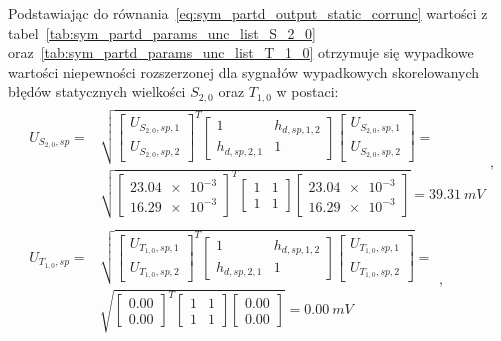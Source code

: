 Podstawiając do równania~\eqref{eq:sym_partd_output_static_corrunc} wartości z tabel~\ref{tab:sym_partd_params_unc_list_S_2_0} oraz~\ref{tab:sym_partd_params_unc_list_T_1_0} otrzymuje się wypadkowe wartości niepewności rozszerzonej dla sygnałów wypadkowych skorelowanych błędów statycznych wielkości $S_{2,0}$ oraz $T_{1,0}$ w postaci:
\begin{gather}
\begin{split}
U_{S_{2,0},sp} = & \sqrt{
\begin{bmatrix}
U_{S_{2,0},sp,1} \\ U_{S_{2,0},sp,2}
\end{bmatrix}^{T}
\begin{bmatrix}
1 & h_{d,sp,1,2} \\
h_{d,sp,2,1} & 1
\end{bmatrix}
\begin{bmatrix}
U_{S_{2,0},sp,1} \\ U_{S_{2,0},sp,2}
\end{bmatrix}} = \\ & \sqrt{
\begin{bmatrix}
\num{23.04e-3} \\ \num{16.29e-3}
\end{bmatrix}^{T}
\begin{bmatrix}
1 & 1 \\
1 & 1
\end{bmatrix}
\begin{bmatrix}
\num{23.04e-3} \\ \num{16.29e-3}
\end{bmatrix}} = \qty{39.31}{mV}
\end{split}
\label{eq:sym_partd_output_static_corrunc_S_2_0}, \\
\begin{split}
U_{T_{1,0},sp} = & \sqrt{
\begin{bmatrix}
U_{T_{1,0},sp,1} \\ U_{T_{1,0},sp,2}
\end{bmatrix}^{T}
\begin{bmatrix}
1 & h_{d,sp,1,2} \\
h_{d,sp,2,1} & 1
\end{bmatrix}
\begin{bmatrix}
U_{T_{1,0},sp,1} \\ U_{T_{1,0},sp,2}
\end{bmatrix}} = \\ & \sqrt{
\begin{bmatrix}
\num{0.00} \\ \num{0.00}
\end{bmatrix}^{T}
\begin{bmatrix}
1 & 1 \\
1 & 1
\end{bmatrix}
\begin{bmatrix}
\num{0.00} \\ \num{0.00}
\end{bmatrix}} = \qty{0.00}{mV}
\end{split}
\label{eq:sym_partd_output_static_corrunc__T_1_0},
\end{gather}
